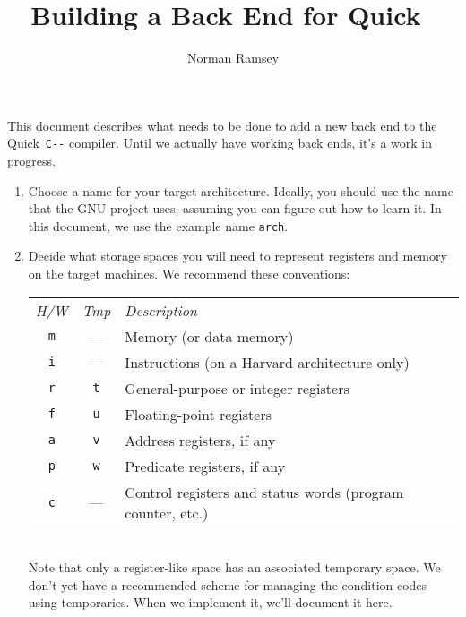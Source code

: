 \documentclass[12pt]{article}
\title{Building a Back End for Quick~{\PAL}}
\author{Norman Ramsey}
\newcommand\PAL{\texttt{C-{}-}}
\begin{document}
\maketitle

This document describes what needs to be done to add a new back end to
the Quick~{\PAL} compiler.
Until we actually have working back ends, it's a work in progress.

\begin{enumerate}
\item
Choose a name for your target architecture.
Ideally, you should use the name that the GNU project uses, assuming
you can figure out how to learn it.
In this document, we use the example name \texttt{arch}.
\item
Decide what storage spaces you will need to represent registers and
memory on the target machines.
We recommend these conventions:\\[3pt]
\begin{tabularx}{\linewidth}{@{\hskip1.5em}cc>{\raggedright\arraybackslash}X@{}}
\emph{H/W}& \emph{Tmp}& \emph{Description}\\
\texttt m& --- & Memory (or data memory)\\
\texttt i& --- & Instructions (on a Harvard architecture only)\\
\texttt r& \texttt t& General-purpose or integer registers\\
\texttt f& \texttt u& Floating-point registers\\
\texttt a& \texttt v& Address registers, if any\\
\texttt p& \texttt w& Predicate registers, if any\\
\texttt c& ---      & Control registers and status words (program
counter, etc.)\\
\end{tabularx}\\[3pt]
Note that only a register-like space has an associated temporary
space.
We don't yet have a recommended scheme for managing the condition
codes using temporaries. 
When we implement it, we'll document it here.


\end{enumerate}
\end{document}
